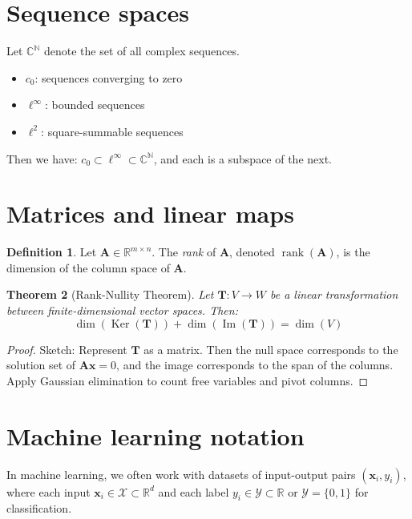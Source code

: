 \documentclass[11pt]{article}
\newcommand{\R}{\mathbb{R}}
\newcommand{\C}{\mathbb{C}}
\newcommand{\N}{\mathbb{N}}
\newcommand{\Xcal}{\mathcal{X}}  %
\newcommand{\Ycal}{\mathcal{Y}}  %
\newcommand{\vect}[1]{\bm{#1}}
\newcommand{\mat}[1]{\bm{#1}}
\DeclareMathOperator{\Ker}{Ker}
\DeclareMathOperator{\Img}{Im}
\DeclareMathOperator{\rank}{rank}
\theoremstyle{definition}
\newtheorem{definition}{Definition}[section]
\theoremstyle{plain}
\newtheorem{theorem}[definition]{Theorem}
\theoremstyle{remark}
\begin{document}
\section{Sequence spaces}

Let \( \C^\N \) denote the set of all complex sequences.

\begin{itemize}
    \item \( c_0 \): sequences converging to zero
    \item \( \ell^\infty \): bounded sequences
    \item \( \ell^2 \): square-summable sequences
\end{itemize}

Then we have: \( c_0 \subset \ell^\infty \subset \C^\N \), and each is a subspace of the next.


\section{Matrices and linear maps}

\begin{definition}
    Let \( \mat{A} \in \R^{m \times n} \). The \emph{rank} of \( \mat{A} \), denoted \( \rank(\mat{A}) \), is the
    dimension of the column space of \( \mat{A} \).
\end{definition}

\begin{theorem}[Rank-Nullity Theorem]
    Let \( \mat{T}: V \to W \) be a linear transformation between finite-dimensional vector spaces. Then:
    \[
        \dim(\Ker(\mat{T})) + \dim(\Img(\mat{T})) = \dim(V)
    \]
\end{theorem}

\begin{proof}
    Sketch: Represent \( \mat{T} \) as a matrix. Then the null space corresponds to the solution set of \(
    \mat{A}\vect{x} = 0 \), and the image corresponds to the span of the columns. Apply Gaussian elimination to count
    free variables and pivot columns.
\end{proof}


\section{Machine learning notation}

In machine learning, we often work with datasets of input-output pairs \( (\vect{x}_i, y_i) \), where each input \(
\vect{x}_i \in \Xcal \subset \R^d \) and each label \( y_i \in \Ycal \subset \R \) or \( \Ycal = \{0,1\} \) for
classification.
\end{document}
